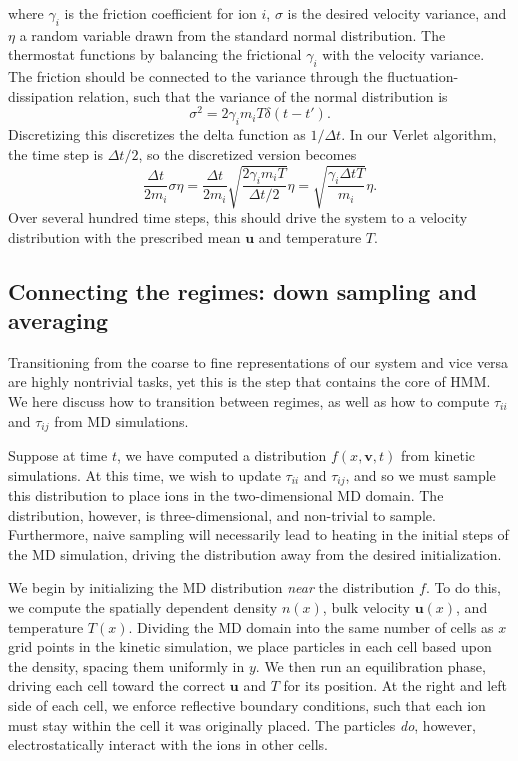 \documentclass{article}
\begin{document}
where $\gamma_i$ is the friction coefficient for ion $i$, $\sigma$ is the desired velocity variance, and $\eta$ a random variable drawn from the standard normal distribution. The thermostat functions by balancing the frictional $\gamma_i$ with the velocity variance. The friction should be connected to the variance through the fluctuation-dissipation relation, such that the variance of the normal distribution is
\[\sigma^2=2\gamma_im_iT\delta(t-t').
\]Discretizing this discretizes the delta function as $1/\Delta t$. In our Verlet algorithm, the time step is $\Delta t/2$, so the discretized version becomes
\[\frac{\Delta t}{2m_i}\sigma\eta=\frac{\Delta t}{2m_i}\sqrt{\frac{2\gamma_im_iT}{\Delta t/2}}\eta=\sqrt{\frac{\gamma_i \Delta tT}{m_i}}\eta.
\]Over several hundred time steps, this should drive the system to a velocity distribution with the prescribed mean $\mathbf{u}$ and temperature $T$.

\subsection{Connecting the regimes: down sampling and averaging}

Transitioning from the coarse to fine representations of our system and vice versa are highly nontrivial tasks, yet this is the step that contains the core of HMM. We here discuss how to transition between regimes, as well as how to compute $\tau_{ii}$ and $\tau_{ij}$ from MD simulations.

Suppose at time $t$, we have computed a distribution $f(x,\mathbf{v},t)$ from kinetic simulations. At this time, we wish to update $\tau_{ii}$ and $\tau_{ij}$, and so we must sample this distribution to place ions in the two-dimensional MD domain. The distribution, however, is three-dimensional, and non-trivial to sample. Furthermore, naive sampling will necessarily lead to heating in the initial steps of the MD simulation, driving the distribution away from the desired initialization.

We begin by initializing the MD distribution \emph{near} the distribution $f$. To do this, we compute the spatially dependent density $n(x)$, bulk velocity $\mathbf{u}(x)$, and temperature $T(x)$. Dividing the MD domain into the same number of cells as $x$ grid points in the kinetic simulation, we place particles in each cell based upon the density, spacing them uniformly in $y$. We then run an equilibration phase, driving each cell toward the correct $\mathbf{u}$ and $T$ for its position. At the right and left side of each cell, we enforce reflective boundary conditions, such that each ion must stay within the cell it was originally placed. The particles \emph{do}, however, electrostatically interact with the ions in other cells.
\end{document}
